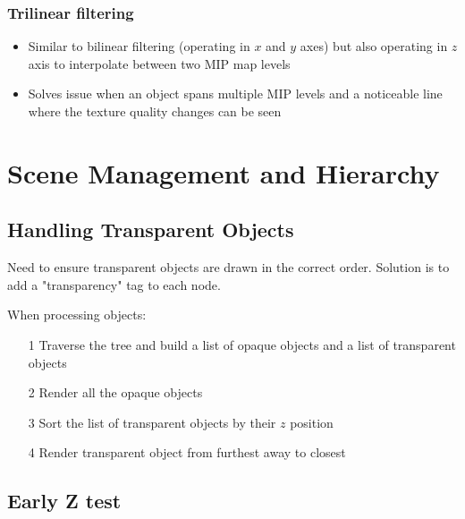 \documentclass[a4paper]{article}
\begin{document}
\subsubsection{Trilinear filtering}

\begin{itemize}
  \item
    Similar to bilinear filtering (operating in $x$ and $y$ axes) but also
    operating in $z$ axis to interpolate between two MIP map levels

  \item
    Solves issue when an object spans multiple MIP levels and a noticeable line
    where the texture quality changes can be seen

\end{itemize}

\section{Scene Management and Hierarchy}

\subsection{Handling Transparent Objects}
\label{sec:handling_transparent_objects}

Need to ensure transparent objects are drawn in the correct order. Solution is
to add a "transparency" tag to each node.

When processing objects:

\begin{enumerate}
  \item[1]
    Traverse the tree and build a list of opaque objects and a list of
    transparent objects

  \item[2]
    Render all the opaque objects

  \item[3]
    Sort the list of transparent objects by their $z$ position

  \item[4]
    Render transparent object from furthest away to closest

\end{enumerate}

\subsection{Early Z test}
\end{document}
